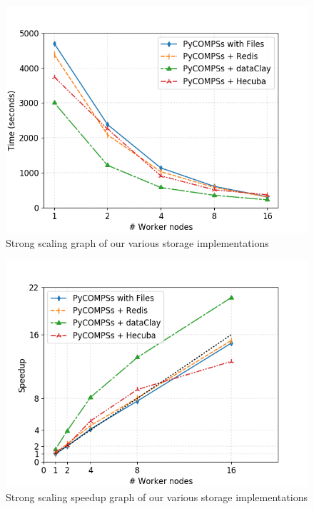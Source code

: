 \begin{figure}
\centering
\includegraphics[scale = 0.5]{figures/storage/matmul.png}
\caption{Strong scaling graph of our various storage implementations}
\label{fig:matmul_strong_redis}
\end{figure}



\begin{figure}
\centering
\includegraphics[scale = 0.5]{figures/storage/matmul_speedup.png}
\caption{Strong scaling speedup graph of our various storage implementations}
\label{fig:matmul_strong_speedup_redis}
\end{figure}

